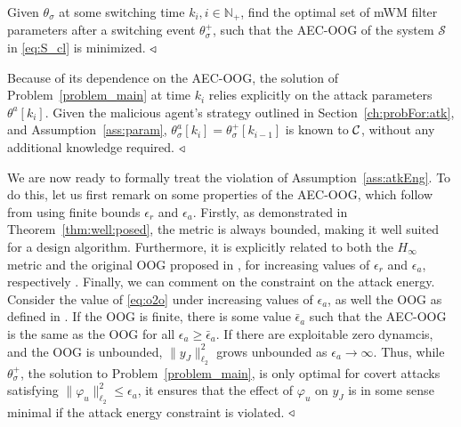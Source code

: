 \begin{problem}\label{problem_main}
Given $\theta_{\sigma}$ at some switching time $k_i, i \in \mathbb{N}_+$, find the optimal set of mWM filter parameters after a switching event $\theta_{\sigma}^+$, such that the AEC-OOG of the system $\mathcal{S}$ in \eqref{eq:S_cl} is minimized. $\hfill \triangleleft$
\end{problem}

\begin{remark}
    Because of its dependence on the AEC-OOG, the solution of Problem~\ref{problem_main} at time $k_i$ relies explicitly on the attack parameters $\theta^a[k_i]$. Given the malicious agent's strategy outlined in Section~\ref{ch:probFor:atk}, and Assumption~\ref{ass:param}, $\theta_\sigma^a[k_i] = \theta_\sigma^+[k_{i-1}]$ is known to $\mathcal{C}$, without any additional knowledge required. %
    $\hfill \triangleleft$
\end{remark}

\begin{remark}\label{rem:atkEng2}
    We are now ready to formally treat the violation of Assumption~\ref{ass:atkEng}.
    To do this, let us first remark on some properties of the AEC-OOG, which follow from using finite bounds $\epsilon_r$ and $\epsilon_a$.
    Firstly, as demonstrated in Theorem~\ref{thm:well:posed}, the metric is always bounded, making it well suited for a design algorithm.
    Furthermore, it is explicitly related to both the $H_\infty$ metric and the original OOG proposed in \cite{teixeira2015strategic}, for increasing values of $\epsilon_r$ and $\epsilon_a$, respectively \citep[Prop.1]{anand2023risk}.
    Finally, we can comment on the constraint on the attack energy.
    Consider the value of \eqref{eq:o2o} under increasing values of $\epsilon_a$, as well the OOG as defined in \cite{teixeira2015strategic}.
    If the OOG is finite, there is some value $\bar\epsilon_a$ such that the AEC-OOG is the same as the OOG for all $\epsilon_a \geq \bar\epsilon_a$.
    If there are exploitable zero dynamcis, and the OOG is unbounded, $\|y_J\|_{\ell_2}^2$ grows unbounded as $\epsilon_a \rightarrow \infty$. Thus, while $\theta_\sigma^+$, the solution to Problem~\ref{problem_main}, is only optimal for covert attacks satisfying $\|\varphi_u\|_{\ell_2}^2 \leq \epsilon_a$, it ensures that the effect of $\varphi_u$ on $y_J$ is in some sense minimal if the attack energy constraint is violated.
    $\hfill\triangleleft$
\end{remark}

